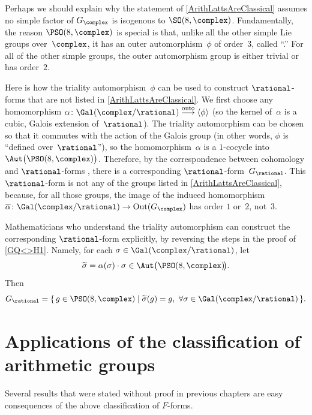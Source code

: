 \begin{rem}[(``triality'')] \label{D4weird} 
Perhaps we should explain why the statement of \cref{ArithLattsAreClassical} assumes no simple factor of $G_\complex$ is isogenous to $\SO(8,\complex)$. Fundamentally, the reason  $\PSO(8,\complex)$ is special is that, unlike all the other simple Lie groups over~$\complex$, it has an
outer automorphism~$\phi$ of order~$3$, called ``\zz.''
For all of the other simple groups, the outer automorphism group is either trivial or has order~$2$.

Here is how the triality automorphism~$\phi$ can be used to construct $\rational$-forms that are not listed in \cref{ArithLattsAreClassical}.
We first choose any homomorphism $\alpha \colon \Gal(\complex/\rational) \stackrel{\text{onto}}{\longrightarrow} \langle \phi \rangle$ (so the kernel of~$\alpha$ is a cubic, Galois extension of~$\rational$).  The triality automorphism can be chosen so that it commutes with the action of the Galois group (in other words, $\phi$ is ``defined over~$\rational$''), so the homomorphism~$\alpha$ is a $1$-cocycle into $\Aut \bigl( \PSO(8,\complex) \bigr)$.
Therefore, by the correspondence between cohomology and $\rational$-forms , there is a corresponding $\rational$-form~$G_\rational$. This $\rational$-form is not any of the groups listed in \cref{ArithLattsAreClassical}, because, for all those groups, the image of the induced homomorphism $\overline\alpha \colon \Gal(\complex/\rational) \to \mathrm{Out}(G_\complex)$ has order $1$ or~$2$, not~$3$.

Mathematicians who understand the triality automorphism can construct the corresponding $\rational$-form explicitly, by reversing the steps in the proof of \cref{GQ<>H1}. Namely, for each $\sigma \in \Gal(\complex/\rational)$, let 
	$$\widetilde\sigma = \alpha(\sigma) \cdot \sigma \in \Aut\bigl( \PSO(8,\complex) \!\bigr) .$$
Then 
	$$G_\rational =  \{\, g \in \PSO(8,\complex) \mid \widetilde\sigma(g) = g, \ \forall\sigma \in \Gal(\complex/\rational) \,\} . $$
 \end{rem}






\section{Applications of the classification of arithmetic groups}

Several results that were stated without proof in previous chapters are easy consequences of the above classification of $F$-forms.

